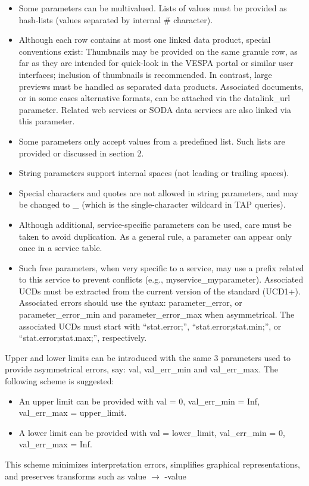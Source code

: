 \documentclass[11pt,a4paper]{ivoa}
\begin{document}
\begin{itemize}
\begin{itemize}
\item Some parameters can be multivalued. Lists of values must be provided as hash-lists (values separated by internal \# character).

\item Although each row contains at most one linked data product, special conventions exist: 
Thumbnails may be provided on the same granule row, as far as they are intended for quick-look in the VESPA portal or similar user interfaces; inclusion of thumbnails is recommended. In contrast, large previews must be handled as separated data products.
Associated documents, or in some cases alternative formats, can be attached via the datalink\_url parameter. Related web services or SODA data services are also linked via this parameter.

\item Some parameters only accept values from a predefined list. Such lists are provided or discussed in section 2.

\item String parameters support internal spaces (not leading or trailing spaces).

\item Special characters and quotes are not allowed in string parameters, and may be changed to \_ (which is the single-character wildcard in TAP queries). 

\item Although additional, service-specific parameters can be used, care must be taken to avoid duplication. As a general rule, a parameter can appear only once in a service table.

\item Such free parameters, when very specific to a service, may use a prefix related to this service to prevent conflicts (e.g., myservice\_myparameter). Associated UCDs must be extracted from the current version of the standard (UCD1+).
Associated errors should use the syntax: parameter\_error, or parameter\_error\_min and parameter\_error\_max when asymmetrical. The associated UCDs must start with ``stat.error;'', ``stat.error;stat.min;'', or ``stat.error;stat.max;'', respectively.
\end{itemize}

Upper and lower limits can be introduced with the same 3 parameters used to provide asymmetrical errors, say: val, val\_err\_min and val\_err\_max. The following scheme is suggested: 

\begin{itemize}
\item An upper limit can be provided with val = 0, val\_err\_min = Inf, val\_err\_max = upper\_limit.

\item A lower limit can be provided with val = lower\_limit, val\_err\_min = 0, val\_err\_max = Inf.
\end{itemize}

This scheme minimizes interpretation errors, simplifies graphical representations, and preserves transforms such as value $\to$ -value


\end{itemize}
\end{document}
